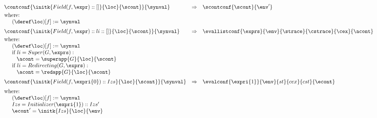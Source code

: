 \documentclass{article}
\begin{document}
\[
  \begin{array}{lcl@{\hspace{30mm}}}
	\contconf{\initk{Field(f, \expr) :: []}{\loc}{\scont}}{\synval}
	& \Rightarrow &
	\scontconf{\scont}{\env'}\\[1mm]
	\textrm{where:}\\
	\hspace{5mm}\update{(\deref\loc)[f]}{\synval}\\[2mm]

	\contconf{\initk{Field(f, \expr) :: li :: []}{\loc}{\scont}}{\synval}
	& \Rightarrow &
	\evallistconf{\exprs}{\env}{\strace}{\cstrace}{\cex}{\acont}\\[1mm]
	\textrm{where:}\\
	\hspace{5mm}\update{(\deref\loc)[f]}{\synval}\\
	\hspace{5mm}\textrm{if } li = Super(G, \exprs):\\
	\hspace{8mm}\acont = \superapp{G}{\loc}{\scont}\\
	\hspace{5mm}\textrm{if } li = Redirecting(G, \exprs):\\
	\hspace{8mm}\acont = \redapp{G}{\loc}{\scont}\\[2mm]

	\contconf{\initk{Field(f, \expri{0}) :: Izs}{\loc}{\scont}}{\synval}
	& \Rightarrow &
	\evalconf{\expri{1}}{\env}{st}{cex}{cst}{\econt}\\[2mm]
	\textrm{where:}\\
	\hspace{5mm}\update{(\deref\loc)[f]}{\synval}\\
	\hspace{5mm}Izs = Initializer(\expri{1}) :: Izs'\\
	\hspace{5mm}\econt' = \initk{Izs}{\loc}{\env}
  \end{array}
\]
\end{document}
